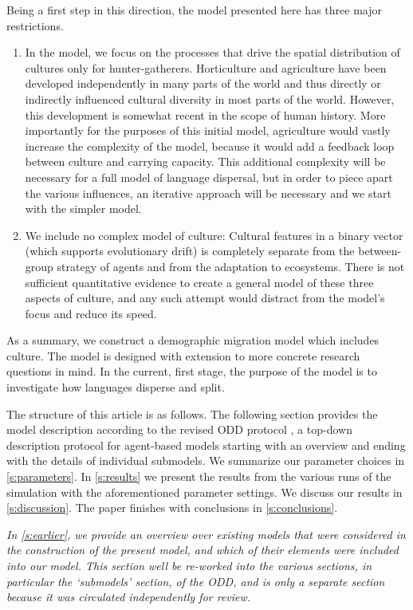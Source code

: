 \documentclass[a4paper,12pt]{scrartcl}
\begin{document}
Being a first step in this direction, the model presented here has three major restrictions.
\begin{enumerate}
\item In the model, we focus on the processes that drive the spatial
  distribution of cultures only for hunter-gatherers. Horticulture and
  agriculture have been developed independently in many parts of the world
  \parencite{} and thus directly or indirectly influenced cultural diversity in
  most parts of the world. However, this development is somewhat recent in the
  scope of human history. More importantly for the purposes of this initial
  model, agriculture would vastly increase the complexity of the model, because
  it would add a feedback loop between culture and carrying capacity. This
  additional complexity will be necessary for a full model of language
  dispersal, but in order to piece apart the various influences, an iterative
  approach will be necessary and we start with the simpler model.
\item We include no complex model of culture: Cultural features in a binary
  vector (which supports evolutionary drift) is completely separate from the
  between-group strategy of agents and from the adaptation to ecosystems.
  There is not sufficient quantitative evidence to create a general model of
  these three aspects of culture, and any such attempt would distract from the
  model's focus and reduce its speed.
\end{enumerate}

As a summary, we construct a demographic migration model which includes culture.
The model is designed with extension to more concrete research questions in
mind. In the current, first stage, the purpose of the model is to investigate
how languages disperse and split.

The structure of this article is as follows. The following section provides the model
description according to the revised ODD protocol
\parencite{grimm2006standard,grimm2010odd}, a top-down description protocol for
agent-based models starting with an overview and ending with the details of
individual submodels. We summarize our parameter choices in \cref{s:parameters}.
In \cref{s:results} we present the results from the various runs of the
simulation with the aforementioned parameter settings. We discuss our results in
\cref{s:discussion}. The paper finishes with conclusions in
\cref{s:conclusions}.

\emph{In \cref{s:earlier}, we provide an overview over existing models that were
  considered in the construction of the present model, and which of their
  elements were included into our model. This section well be re-worked into the
  various sections, in particular the ‘submodels’ section, of the ODD, and is
  only a separate section because it was circulated independently for review.}
\end{document}
